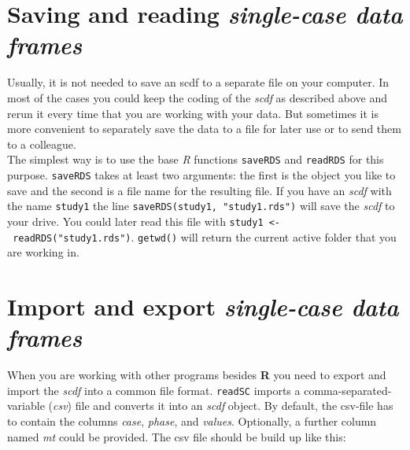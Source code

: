 \documentclass[
]{book}
\begin{document}
\hypertarget{saving-and-reading-single-case-data-frames}{%
\section{\texorpdfstring{Saving and reading \emph{single-case data frames}}{Saving and reading single-case data frames}}\label{saving-and-reading-single-case-data-frames}}

Usually, it is not needed to save an scdf to a separate file on your computer. In most of the cases you could keep the coding of the \emph{scdf} as described above and rerun it every time that you are working with your data. But sometimes it is more convenient to separately save the data to a file for later use or to send them to a colleague.\\
The simplest way is to use the base \emph{R} functions \texttt{saveRDS} and \texttt{readRDS} for this purpose. \texttt{saveRDS} takes at least two arguments: the first is the object you like to save and the second is a file name for the resulting file. If you have an \emph{scdf} with the name \texttt{study1} the line \texttt{saveRDS(study1,\ "study1.rds")} will save the \emph{scdf} to your drive. You could later read this file with \texttt{study1\ \textless{}-\ readRDS("study1.rds")}. \texttt{getwd()} will return the current active folder that you are working in.

\hypertarget{import-and-export-single-case-data-frames}{%
\section{\texorpdfstring{Import and export \emph{single-case data frames}}{Import and export single-case data frames}}\label{import-and-export-single-case-data-frames}}

When you are working with other programs besides \textbf{R} you need to export and import the \emph{scdf} into a common file format. \texttt{readSC} imports a comma-separated-variable (\emph{csv}) file and converts it into an \emph{scdf} object. By default, the csv-file has to contain the columns \emph{case}, \emph{phase}, and \emph{values}. Optionally, a further column named \emph{mt} could be provided. The csv file should be build up like this:
\end{document}
